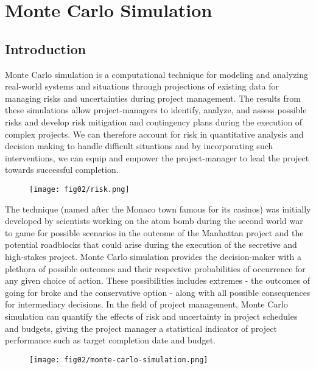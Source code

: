 \let\textcircled=\pgftextcircled
\chapter{Monte Carlo Simulation}
\label{chap:litrev}
\section{Introduction}
Monte Carlo simulation is a computational technique for modeling and analyzing real-world systems and situations through projections of existing data for managing risks and uncertainties during project management. The results from these simulations allow project-managers to identify, analyze, and assess possible risks and develop risk mitigation and contingency plans during the execution of complex projects. We can therefore account for risk in quantitative analysis and decision making to handle difficult situations and by incorporating such interventions, we can equip and empower the project-manager to lead the project towards successful completion. 

\begin{figure}
	\centering
	\texttt{[image: fig02/risk.png]}
\end{figure}

The technique (named after the Monaco town famous for its casinos) was initially developed by scientists working on the atom bomb during the second world war to game for possible scenarios in the outcome of the Manhattan project and the potential roadblocks that could arise during the execution of the secretive and high-stakes project. Monte Carlo simulation provides the decision-maker with a plethora of possible outcomes and their respective probabilities of occurrence for any given choice of action. These possibilities includes extremes - the outcomes of going for broke and the conservative option - along with all possible consequences for intermediary decisions. In the field of project management, Monte Carlo simulation can quantify the effects of risk and uncertainty in project schedules and budgets, giving the project manager a statistical indicator of project performance such as target completion date and budget.


\begin{figure}
	\centering
	\texttt{[image: fig02/monte-carlo-simulation.png]}
\end{figure}


